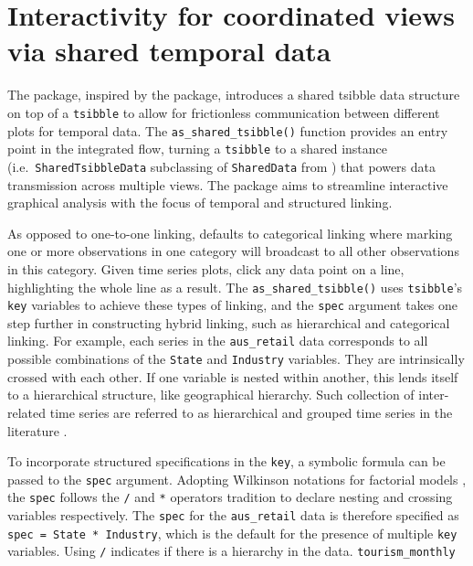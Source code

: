\hypertarget{interactivity-for-coordinated-views-via-shared-temporal-data}{%
\section{Interactivity for coordinated views via shared temporal
data}\label{interactivity-for-coordinated-views-via-shared-temporal-data}}

The  package, inspired by the 
package, introduces a shared tsibble data structure on top of a
\texttt{tsibble} to allow for frictionless communication between
different plots for temporal data. The \texttt{as\_shared\_tsibble()}
function provides an entry point in the integrated flow, turning a
\texttt{tsibble} to a shared instance (i.e.~\texttt{SharedTsibbleData}
subclassing of \texttt{SharedData} from ) that powers
data transmission across multiple views. The 
package aims to streamline interactive graphical analysis with the focus
of temporal and structured linking.

As opposed to one-to-one linking,  defaults to
categorical linking where marking one or more observations in one
category will broadcast to all other observations in this category.
Given time series plots, click any data point on a line, highlighting
the whole line as a result. The \texttt{as\_shared\_tsibble()} uses
\texttt{tsibble}'s \texttt{key} variables to achieve these types of
linking, and the \texttt{spec} argument takes one step further in
constructing hybrid linking, such as hierarchical and categorical
linking. For example, each series in the \texttt{aus\_retail} data
corresponds to all possible combinations of the \texttt{State} and
\texttt{Industry} variables. They are intrinsically crossed with each
other. If one variable is nested within another, this lends itself to a
hierarchical structure, like geographical hierarchy. Such collection of
inter-related time series are referred to as hierarchical and grouped
time series in the literature \citep{fpp}.

To incorporate structured specifications in the \texttt{key}, a symbolic
formula can be passed to the \texttt{spec} argument. Adopting Wilkinson
notations for factorial models \citep{Wilkinson1973}, the \texttt{spec}
follows the \texttt{/} and \texttt{*} operators tradition to declare
nesting and crossing variables respectively. The \texttt{spec} for the
\texttt{aus\_retail} data is therefore specified as
\texttt{spec\ =\ State\ *\ Industry}, which is the default for the
presence of multiple \texttt{key} variables. Using \texttt{/} indicates
if there is a hierarchy in the data. \texttt{tourism\_monthly}

